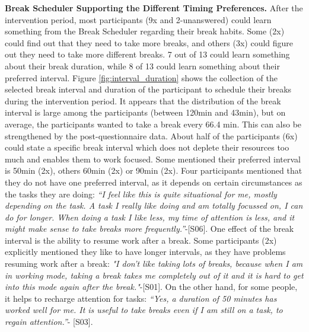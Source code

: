 \documentclass{hasel_thesis}
\begin{document}
\textbf{Break Scheduler Supporting the Different Timing Preferences.}
After the intervention period, most participants (9x and 2-unanswered) could learn something from the Break Scheduler regarding their break habits. Some (2x) could find out that they need to take more breaks, and others (3x) could figure out they need to take more different breaks. 7 out of 13 could learn something about their break duration, while 8 of 13 could learn something about their preferred interval. Figure \ref{fig:interval_duration} shows the collection of the selected break interval and duration of the participant to schedule their breaks during the intervention period. It appears that the distribution of the break interval is large among the participants (between 120min and 43min), but on average, the participants wanted to take a break every 66.4 min. This can also be strengthened by the post-questionnaire data. About half of the participants (6x) could state a specific break interval which does not deplete their resources too much and enables them to work focused. Some mentioned their preferred interval is 50min (2x), others 60min (2x) or 90min (2x). Four participants mentioned that they do not have one preferred interval, as it depends on certain circumstances as the tasks they are doing: \textit{“I feel like this is quite situational for me, mostly depending on the task. A task I really like doing and am totally focussed on, I can do for longer. When doing a task I like less, my time of attention is less, and it might make sense to take breaks more frequently.”}-[S06]. One effect of the break interval is the ability to resume work after a break. Some participants (2x) explicitly mentioned they like to have longer intervals, as they have problems resuming work after a break: \textit{"I don't like taking lots of breaks, because when I am in working mode, taking a break takes me completely out of it and it is hard to get into this mode again after the break."}-[S01]. On the other hand, for some people, it helps to recharge attention for tasks: \textit{“Yes, a duration of 50 minutes has worked well for me. It is useful to take breaks even if I am still on a task, to regain attention.”}- [S03]. 
\end{document}
